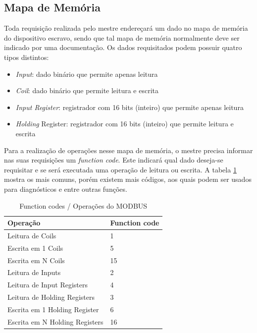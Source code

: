 \subsection{Mapa de Memória}

Toda requisição realizada pelo mestre endereçará um dado no mapa de memória do dispositivo escravo, sendo que tal mapa de memória normalmente deve ser indicado por uma documentação. Os dados requisitados podem possuir quatro tipos distintos:

\begin{itemize}
  \item \textit{Input}: dado binário que permite apenas leitura
  \item \textit{Coil}: dado binário que permite leitura e escrita
  \item \textit{Input Register}: registrador com 16 bits (inteiro) que permite apenas leitura
  \item \textit{Holding} Register: registrador com 16 bits (inteiro) que permite leitura e escrita
\end{itemize}

Para a realização de operações nesse mapa de memória, o mestre precisa informar nas suas requisições um \textit{function code}. Este indicará qual dado deseja-se requisitar e se será executada uma operação de leitura ou escrita. A tabela \ref{table:modbus-funccodes} mostra os mais comuns, porém existem mais códigos, aos quais podem ser usados para diagnósticos e entre outras funções.

\begin{table}[]
\centering
\caption{Function codes / Operações do MODBUS}
\label{table:modbus-funccodes}
\begin{tabular}{@{}ll@{}}
\toprule
\textbf{Operação}              & \textbf{Function code} \\ \midrule
Leitura de Coils               & 1                      \\
Escrita em 1 Coils             & 5                      \\
Escrita em N Coils             & 15                     \\
Leitura de Inputs              & 2                      \\
Leitura de Input Registers     & 4                      \\
Leitura de Holding Registers   & 3                      \\
Escrita em 1 Holding Register  & 6                      \\
Escrita em N Holding Registers & 16                     \\ \bottomrule
\end{tabular}
\end{table}

